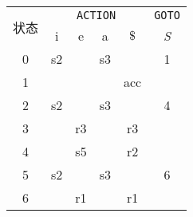 \documentclass[border=1em,varwidth=\maxdimen]{standalone}
\begin{document}
\begin{table}
  \begin{tabular}{cccccc}
    \toprule
    \multirow{2}{*}{状态} & \multicolumn{4}{c}{\texttt{ACTION}} &
                                                                  \texttt{GOTO}\\
    \cline{2-6}
                          & i & e & a & \(\$\) & \textit{S}\\
    \midrule
    0 & s2  &     & s3  &     & 1\\
    1 &     &     &     & acc &  \\
    2 & s2  &     & s3  &     & 4\\
    3 &     & r3  &     & r3  &  \\
    4 &     & s5  &     & r2  &  \\
    5 & s2  &     & s3  &     & 6\\
    6 &     & r1  &     & r1  &  \\
    \bottomrule
  \end{tabular}
\end{table}
\end{document}
